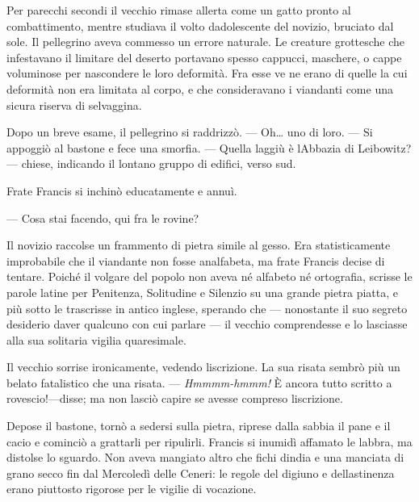 Per parecchi secondi il vecchio rimase all\textquotesingle erta come un
gatto pronto al combattimento, mentre studiava il volto
d\textquotesingle adolescente del novizio, bruciato dal sole. Il
pellegrino aveva commesso un errore naturale. Le creature grottesche che
infestavano il limitare del deserto portavano spesso cappucci, maschere,
o cappe voluminose per nascondere le loro deformità. Fra esse ve ne
erano di quelle la cui deformità non era limitata al corpo, e che
consideravano i viandanti come una sicura riserva di selvaggina.

Dopo un breve esame, il pellegrino si raddrizzò. --- Oh\ldots{} uno di
loro. --- Si appoggiò al bastone e fece una smorfia. --- Quella laggiù è
l\textquotesingle Abbazia di Leibowitz? --- chiese, indicando il lontano
gruppo di edifici, verso sud.

Frate Francis si inchinò educatamente e annuì.

--- Cosa stai facendo, qui fra le rovine?

Il novizio raccolse un frammento di pietra simile al gesso. Era
statisticamente improbabile che il viandante non fosse analfabeta, ma
frate Francis decise di tentare. Poiché il volgare del popolo non aveva
né alfabeto né ortografia, scrisse le parole latine per Penitenza,
Solitudine e Silenzio su una grande pietra piatta, e più sotto le
trascrisse in antico inglese, sperando che --- nonostante il suo segreto
desiderio d\textquotesingle aver qualcuno con cui parlare --- il vecchio
comprendesse e lo lasciasse alla sua solitaria vigilia quaresimale.

Il vecchio sorrise ironicamente, vedendo l\textquotesingle iscrizione.
La sua risata sembrò più un belato fatalistico che una risata. ---
\emph{Hmmmm-hmmm!} È ancora tutto scritto a rovescio!---disse; ma non
lasciò capire se avesse compreso l\textquotesingle iscrizione.

Depose il bastone, tornò a sedersi sulla pietra, riprese dalla sabbia il
pane e il cacio e cominciò a grattarli per ripulirli. Francis si inumidì
affamato le labbra, ma distolse lo sguardo. Non aveva mangiato altro che
fichi d\textquotesingle india e una manciata di grano secco fin dal
Mercoledì delle Ceneri: le regole del digiuno e
dell\textquotesingle astinenza erano piuttosto rigorose per le vigilie
di vocazione.


